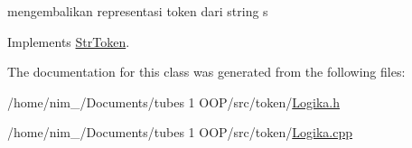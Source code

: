 mengembalikan representasi token dari string s 



Implements \hyperlink{class_str_token_ae3f06fac8d7030218db0d833fae6f773}{Str\-Token}.



The documentation for this class was generated from the following files\-:\begin{DoxyCompactItemize}
\item 
/home/nim\-\_/\-Documents/tubes 1 O\-O\-P/src/token/\hyperlink{_logika_8h}{Logika.\-h}\item 
/home/nim\-\_/\-Documents/tubes 1 O\-O\-P/src/token/\hyperlink{_logika_8cpp}{Logika.\-cpp}\end{DoxyCompactItemize}
